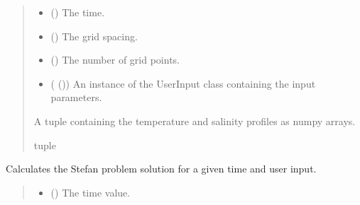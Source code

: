 \documentclass[a4paper,11pt,english,openany]{sphinxmanual}
\begin{document}
\begin{fulllineitems}
\begin{fulllineitems}
\begin{quote}
\begin{description}
\begin{itemize}
\item {} 
\sphinxAtStartPar
{} () \textendash{} The time.

\item {} 
\sphinxAtStartPar
{} () \textendash{} The grid spacing.

\item {} 
\sphinxAtStartPar
{} () \textendash{} The number of grid points.

\item {} 
\sphinxAtStartPar
{} ({\hyperref[\detokenize{api/spyice.parameters.user_input:spyice.parameters.user_input.UserInput}]{}} ()) \textendash{} An instance of the UserInput class containing the input parameters.

\end{itemize}

\sphinxAtStartPar
A tuple containing the temperature and salinity profiles as numpy arrays.

\sphinxAtStartPar
tuple

\end{description}\end{quote}

\end{fulllineitems}


\begin{fulllineitems}
\label{\detokenize{api/spyice.models.stefan_problem:spyice.models.stefan_problem.StefanProblem.stefan_problem}}
\pysigstartsignatures
{}
\pysigstopsignatures
\sphinxAtStartPar
Calculates the Stefan problem solution for a given time and user input.
\begin{quote}\begin{description}
\begin{itemize}
\item {} 
\sphinxAtStartPar
{} () \textendash{} The time value.


\end{itemize}
\end{description}
\end{quote}
\end{fulllineitems}
\end{fulllineitems}
\end{document}
